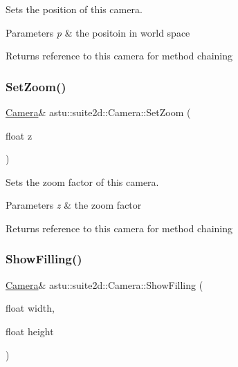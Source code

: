 Sets the position of this camera.


\begin{DoxyParams}{Parameters}
{\em p} & the positoin in world space \\
\hline
\end{DoxyParams}
\begin{DoxyReturn}{Returns}
reference to this camera for method chaining 
\end{DoxyReturn}
\mbox{\label{classastu_1_1suite2d_1_1Camera_a39adef429a83c4e9fdf47ddafbb4b0b9}} 
\subsubsection{\texorpdfstring{Set\+Zoom()}{SetZoom()}}
{\footnotesize\ttfamily \hyperlink{classastu_1_1suite2d_1_1Camera}{Camera}\& astu\+::suite2d\+::\+Camera\+::\+Set\+Zoom (\begin{DoxyParamCaption}\item[{float}]{z }\end{DoxyParamCaption})}

Sets the zoom factor of this camera.


\begin{DoxyParams}{Parameters}
{\em z} & the zoom factor \\
\hline
\end{DoxyParams}
\begin{DoxyReturn}{Returns}
reference to this camera for method chaining 
\end{DoxyReturn}
\mbox{\label{classastu_1_1suite2d_1_1Camera_a2d6d21250d02dfa510d4584b32186b25}} 
\subsubsection{\texorpdfstring{Show\+Filling()}{ShowFilling()}\hspace{0.1cm}{\footnotesize\ttfamily [1/2]}}
{\footnotesize\ttfamily \hyperlink{classastu_1_1suite2d_1_1Camera}{Camera}\& astu\+::suite2d\+::\+Camera\+::\+Show\+Filling (\begin{DoxyParamCaption}\item[{float}]{width,  }\item[{float}]{height }\end{DoxyParamCaption})}

